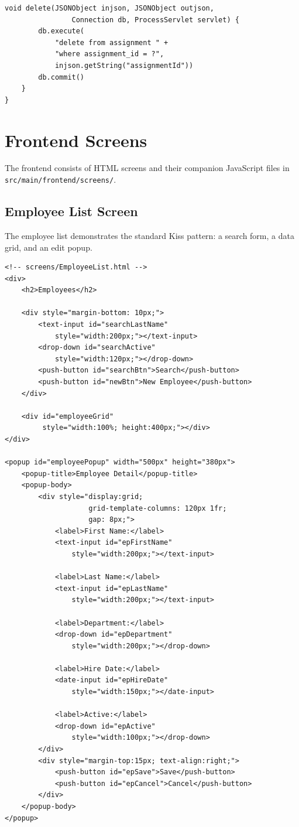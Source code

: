 \begin{lstlisting}[style=groovy]
    void delete(JSONObject injson, JSONObject outjson,
                Connection db, ProcessServlet servlet) {
        db.execute(
            "delete from assignment " +
            "where assignment_id = ?",
            injson.getString("assignmentId"))
        db.commit()
    }
}
\end{lstlisting}

\section{Frontend Screens}
\label{sec:app-screens}

The frontend consists of HTML screens and their companion JavaScript files in \texttt{src/main/frontend/screens/}.

\subsection{Employee List Screen}

The employee list demonstrates the standard Kiss pattern: a search form, a data grid, and an edit popup.

\begin{lstlisting}[style=html]
<!-- screens/EmployeeList.html -->
<div>
    <h2>Employees</h2>

    <div style="margin-bottom: 10px;">
        <text-input id="searchLastName"
            style="width:200px;"></text-input>
        <drop-down id="searchActive"
            style="width:120px;"></drop-down>
        <push-button id="searchBtn">Search</push-button>
        <push-button id="newBtn">New Employee</push-button>
    </div>

    <div id="employeeGrid"
         style="width:100%; height:400px;"></div>
</div>

<popup id="employeePopup" width="500px" height="380px">
    <popup-title>Employee Detail</popup-title>
    <popup-body>
        <div style="display:grid;
                    grid-template-columns: 120px 1fr;
                    gap: 8px;">
            <label>First Name:</label>
            <text-input id="epFirstName"
                style="width:200px;"></text-input>

            <label>Last Name:</label>
            <text-input id="epLastName"
                style="width:200px;"></text-input>

            <label>Department:</label>
            <drop-down id="epDepartment"
                style="width:200px;"></drop-down>

            <label>Hire Date:</label>
            <date-input id="epHireDate"
                style="width:150px;"></date-input>

            <label>Active:</label>
            <drop-down id="epActive"
                style="width:100px;"></drop-down>
        </div>
        <div style="margin-top:15px; text-align:right;">
            <push-button id="epSave">Save</push-button>
            <push-button id="epCancel">Cancel</push-button>
        </div>
    </popup-body>
</popup>
\end{lstlisting}

